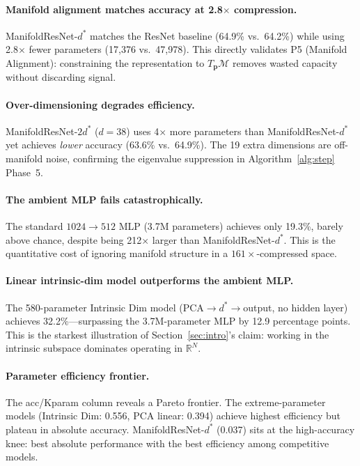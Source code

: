 \documentclass[11pt,letterpaper]{article}
\newcommand{\R}{\mathbb{R}}
\newcommand{\pos}{\mathbf{p}}
\newcommand{\manifold}{\mathcal{M}}
\newcommand{\tangent}{T}
\begin{document}
\paragraph{Manifold alignment matches accuracy at 2.8$\times$ compression.}
ManifoldResNet-$d^*$ matches the ResNet baseline (64.9\% vs.\ 64.2\%)
while using 2.8$\times$ fewer parameters (17{,}376 vs.\ 47{,}978).
This directly validates P5 (Manifold Alignment): constraining the
representation to $\tangent_\pos\manifold$ removes wasted capacity without
discarding signal.

\paragraph{Over-dimensioning degrades efficiency.}
ManifoldResNet-$2d^*$ ($d=38$) uses 4$\times$ more parameters than
ManifoldResNet-$d^*$ yet achieves \emph{lower} accuracy (63.6\% vs.\ 64.9\%).
The 19 extra dimensions are off-manifold noise, confirming the eigenvalue
suppression in Algorithm~\ref{alg:step} Phase~5.

\paragraph{The ambient MLP fails catastrophically.}
The standard $1024\to512$ MLP (3.7M parameters) achieves only 19.3\%,
barely above chance, despite being 212$\times$ larger than
ManifoldResNet-$d^*$.  This is the quantitative cost of ignoring manifold
structure in a $161\times$-compressed space.

\paragraph{Linear intrinsic-dim model outperforms the ambient MLP.}
The 580-parameter Intrinsic Dim model (PCA$\to d^*\to$output, no hidden
layer) achieves 32.2\%---surpassing the 3.7M-parameter MLP by 12.9
percentage points.  This is the starkest illustration of
Section~\ref{sec:intro}'s claim: working in the intrinsic subspace
dominates operating in $\R^N$.

\paragraph{Parameter efficiency frontier.}
The acc/Kparam column reveals a Pareto frontier.  The extreme-parameter
models (Intrinsic Dim: 0.556, PCA linear: 0.394) achieve highest
efficiency but plateau in absolute accuracy.  ManifoldResNet-$d^*$ (0.037)
sits at the high-accuracy knee: best absolute performance with the best
efficiency among competitive models.
\end{document}
